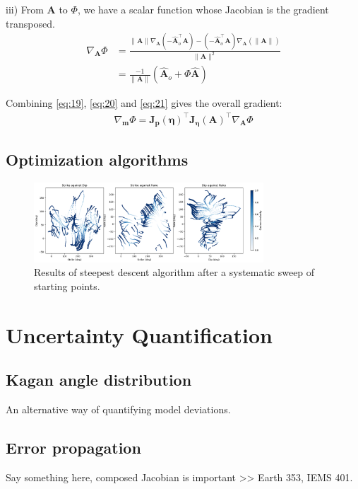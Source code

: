 \documentclass[preprint]{seismica}
\begin{document}
    iii) From $\bm{A}$ to $\Phi$, we have a scalar function whose Jacobian is the gradient
    transposed.
    \begin{align} \label{eq:21}
      \nonumber\nabla_{\bm{A}}\Phi &= \frac{\|\bm{A}\|\nabla_{\bm{A}}(-\hat{\bm{A}}_o^\top\bm{A}) - 
      (-\hat{\bm{A}}_o^\top \bm{A}) \nabla_{\bm{A}}(\|\bm{A}\|)}{\|\bm{A}\|^2}\\
            &= \frac{-1}{\|\bm{A}\|}(\hat{\bm{A}}_o + \Phi\hat{\bm{A}})
    \end{align}

    Combining \ref{eq:19}, \ref{eq:20} and \ref{eq:21} gives the overall gradient:
    \begin{align} \label{eq:22}
      \nabla_{\bm{m}}\Phi = \bm{J_p}(\bm{\eta})^\top \bm{J_\eta}(\bm{A})^\top \nabla_{\bm{A}}\Phi
    \end{align}

  \subsection{Optimization algorithms}
    \begin{figure}[ht!]
      \includegraphics[width=8.6cm]{seed_2024} 
      \caption{Results of steepest descent algorithm after a systematic sweep of starting points.}
      \label{fig:2}
    \end{figure}


\section{Uncertainty Quantification} \label{sec:uncertainty}

    \subsection{Kagan angle distribution}
      An alternative way of quantifying model deviations.

    \subsection{Error propagation}
      Say something here, composed Jacobian is important >> Earth 353, IEMS 401.
\end{document}
